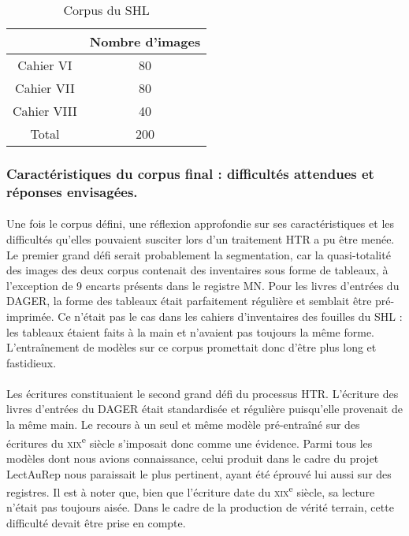 \documentclass[a4paper,12pt,twoside]{book}
\begin{document}
\begin{table}[h]
	\centering
	\begin{tabular}{|c|c|}
		\hline
		& \textbf{Nombre d'images} \\ %
		\hline
		Cahier VI & 80 \\ %
		\hline
		Cahier VII  & 80 \\ %
		\hline
		Cahier VIII & 40 \\ %
		\hline
		Total & 200 \\
		\hline
	\end{tabular}
	\caption{Corpus du SHL} %
	\label{tab:corpus_shl} %
\end{table}

		\subsubsection{Caractéristiques du corpus final : difficultés attendues et réponses envisagées.}

\paragraph{}
Une fois le corpus défini, une réflexion approfondie sur ses caractéristiques et les difficultés qu’elles pouvaient susciter lors d’un traitement HTR a pu être menée. Le premier grand défi serait probablement la segmentation, car la quasi-totalité des images des deux corpus contenait des inventaires sous forme de tableaux, à l’exception de 9 encarts présents dans le registre MN. Pour les livres d’entrées du DAGER, la forme des tableaux était parfaitement régulière et semblait être pré-imprimée. Ce n’était pas le cas dans les cahiers d’inventaires des fouilles du SHL : les tableaux étaient faits à la main et n’avaient pas toujours la même forme. L’entraînement de modèles sur ce corpus promettait donc d’être plus long et fastidieux.

\paragraph{}
Les écritures constituaient le second grand défi du processus HTR. L’écriture des livres d’entrées du DAGER était standardisée et régulière puisqu'elle provenait de la même main. Le recours à un seul et même modèle pré-entraîné sur des écritures du \textsc{xix}\textsuperscript{e} siècle s’imposait donc comme une évidence. Parmi tous les modèles dont nous avions connaissance, celui produit dans le cadre du projet LectAuRep nous paraissait le plus pertinent, ayant été éprouvé lui aussi sur des registres. Il est à noter que, bien que l’écriture date du \textsc{xix}\textsuperscript{e} siècle, sa lecture n’était pas toujours aisée. Dans le cadre de la production de vérité terrain, cette difficulté devait être prise en compte.
\end{document}
